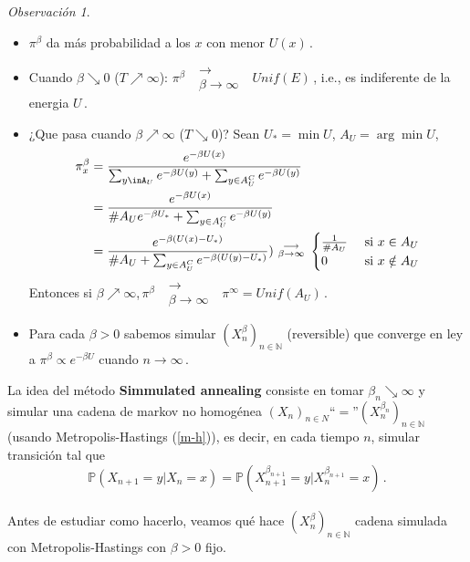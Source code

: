\documentclass[letterpaper,11pt]{article} %
\def\espacio{\hspace{.25cm}\,}
\theoremstyle{defbreak}
\theoremstyle{propbreak}
\theoremstyle{remark}
\newtheorem{remark}{Observación}[subsection]
\theoremstyle{break}
\def\P{\mathbb{P}}
\def\N{\mathbb{N}}
\def\beforeitemize{\leavevmode \vspace{-0.5\baselineskip}}
\def\xcm{(X_n)_{n\in N}}
\begin{document}
\begin{remark}
\beforeitemize
\begin{itemize}
    \item $\pi^\beta$ da más probabilidad a los $x$ con menor $U(x)$\,.
    \item Cuando $\beta \searrow 0$ ($T\nearrow\infty$): $\pi^\beta\mbox{ }\substack{\longrightarrow \\ \beta\to\infty}\mbox{ }Unif(E)$\,,
    i.e., es indiferente de la energia $U$\,.
    \item ¿Que pasa cuando $\beta\nearrow \infty$ ($T\searrow 0$)?
    \newline Sean $U_*=\min U$, $A_U=\arg\min U$,
    \begin{alignat*}{2}
        \pi^\beta_x & = \displaystyle\frac{e^{-\beta U(x)}}{\sum_{y\inA_U}e^{-\beta U(y)}+\sum_{y\in A^C_U}e^{-\beta U(y)}} \\
         & = \displaystyle\frac{e^{-\beta U(x)}}{\# A_U e^{-\beta U_*}+\sum_{y\in A^C_U}e^{-\beta U(y)}} \\
         & = \displaystyle\frac{e^{-\beta (U(x)-U_*)}}{\# A_U +\sum_{y\in A^C_U}e^{-\beta (U(y)-U_*)}}) \mbox{ }\substack{\longrightarrow \\ \beta\to\infty}\mbox{ }\begin{cases}
    \frac{1}{\# A_U}  & \mbox{ si } x\in A_U  \\
    0  & \mbox{ si } x \notin A_U
    \end{cases}
    \end{alignat*}
    Entonces si $\beta\nearrow \infty$,\espacio $\pi^\beta\mbox{ }\substack{\longrightarrow \\ \beta\to\infty}\mbox{ }\pi^\infty=Unif(A_U)$\,.
    \item Para cada $\beta>0$ sabemos simular $(X^\beta_n)_{n\in\N}$ (reversible) que converge en ley a $\pi^\beta\propto e^{-\beta U}$ cuando $n\to\infty$\,.
\end{itemize}
\end{remark}
La idea del método \textbf{Simmulated annealing} consiste en tomar $\beta_n\searrow \infty$ y simular una cadena de markov no homogénea $\xcm$``$=$''$(X_n^{\beta_n})_{n\in\N}$ (usando Metropolis-Hastings (\ref{m-h})), es decir, en cada tiempo $n$, simular transición tal que
$$ \P(X_{n+1}=y|X_n=x)=\P(X_{n+1}^{\beta_{n+1}}=y|X_n^{\beta_{n+1}}=x)\,.$$
\vspace{.5cm}\\
Antes de estudiar como hacerlo, veamos qu\'e hace $(X^\beta_n)_{n\in\N}$ cadena simulada con Metropolis-Hastings con $\beta>0$ fijo.
\end{document}
